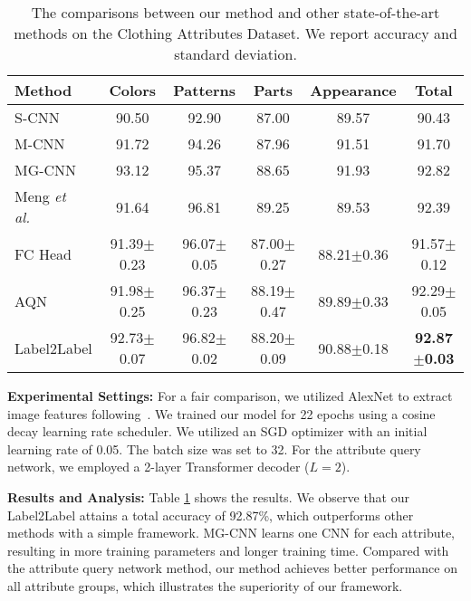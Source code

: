 \documentclass[runningheads]{llncs}
\begin{document}
\begin{table}[tbp]
  \caption{The comparisons between our method and other state-of-the-art methods on the Clothing Attributes Dataset. 
  We report accuracy and standard deviation.}
\label{table:result:clothing}
\centering
\begin{tabular}{lccccc}
\toprule
Method  & Colors & Patterns & Parts & Appearance & Total \\
\midrule
S-CNN~\cite{abdulnabi2015multi} & 90.50 &92.90& 87.00& 89.57& 90.43 \\
M-CNN~\cite{abdulnabi2015multi} & 91.72& 94.26& 87.96& 91.51& 91.70 \\
MG-CNN~\cite{abdulnabi2015multi} & 93.12& 95.37& 88.65& 91.93& 92.82 \\
Meng \emph{et al.}~\cite{meng2018efficient} & 91.64& 96.81& 89.25& 89.53& 92.39 \\
\midrule
FC Head & 91.39$\pm$0.23&  96.07$\pm$0.05&  87.00$\pm$0.27&  88.21$\pm$0.36 & 91.57$\pm$0.12 \\
AQN &  91.98$\pm$0.25& 96.37$\pm$0.23& 88.19$\pm$0.47&  89.89$\pm$0.33&  92.29$\pm$0.05 \\
Label2Label & 92.73$\pm$0.07 & 96.82$\pm$0.02& 88.20$\pm$0.09& 90.88$\pm$0.18& \textbf{92.87}$\pm$\textbf{0.03}\\
\bottomrule
\end{tabular}
\end{table}


\textbf{Experimental Settings:} For a fair comparison, we utilized AlexNet to extract image features following~\cite{abdulnabi2015multi,meng2018efficient}. We trained our model for 22 epochs using a cosine decay learning rate scheduler. We utilized an SGD optimizer with an initial learning rate of 0.05.
The batch size was set to 32. For the attribute query network, we employed a 2-layer Transformer decoder ($L=2$).



\textbf{Results and Analysis:} 
Table \ref{table:result:clothing} shows the results.
We observe that our Label2Label attains a total accuracy of 92.87\%, which outperforms other methods with a simple framework. MG-CNN learns one CNN for each attribute, resulting in more training parameters and longer training time. Compared with the attribute query network method, our method achieves better performance on all attribute groups, which illustrates the superiority of our framework.
\end{document}
